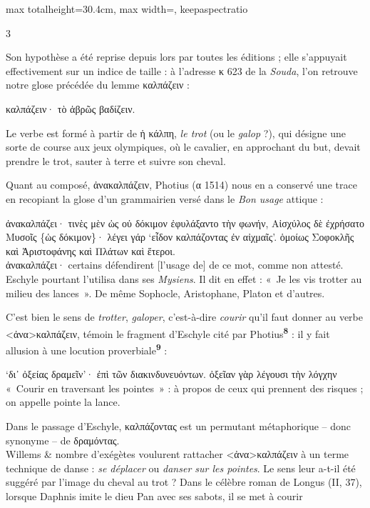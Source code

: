 \documentclass[11pt,twoside]{book}
\newcommand{\italique}[1]{\textit{#1}}
\newcommand{\citComm}[1]{\begin{quoting}[vskip=0.4pt,leftmargin=0.7em,rightmargin=0.2em]#1\end{quoting}}
\newcommand{\marqueur}[1]{\textsuperscript{\color{rubricRed}\textbf{#1}}}
\begin{document}
\begin{adjustbox}{max totalheight=30.4cm, max width=\textwidth, keepaspectratio}
\begin{minipage}{\textwidth}
{\begin{multicols}{3}
\par\vspace{1.5pt}
\noindent Son hypothèse a été reprise depuis lors par toutes les éditions ; elle s'appuyait effectivement sur un indice de taille : à l'adresse κ 623 de la \italique{Souda}, l'on retrouve notre glose précédée du lemme καλπάζειν :
\citComm{καλπάζειν· τὸ ἁβρῶς βαδίζειν.}
\par\vspace{1.5pt}
\noindent Le verbe est formé à partir de ἡ κάλπη, \italique{le trot} (ou le \italique{galop} ?), qui désigne une sorte de course aux jeux olympiques, où le cavalier, en approchant du but, devait prendre le trot, sauter à terre et suivre son cheval.
\par\vspace{1.5pt}
\noindent Quant au composé, ἀνακαλπάζειν, Photius (α 1514) nous en a conservé une trace en recopiant la glose d'un grammairien versé dans le \italique{Bon usage} attique :
\citComm{ἀνακαλπάζει· τινὲς μὲν ὡς οὐ δόκιμον ἐφυλάξαντο τὴν φωνήν, Αἰσχύλος δὲ ἐχρήσατο Μυσοῖς \{ὡς δόκιμον\}· λέγει γάρ `εἶδον καλπάζοντας ἐν αἰχμαῖς'. ὁμοίως Σοφοκλῆς καὶ Ἀριστοφάνης καὶ Πλάτων καὶ ἕτεροι.\\
ἀνακαλπάζει· certains défendirent [l'usage de] de ce mot, comme non attesté. Eschyle pourtant l'utilisa dans ses \italique{Mysiens}. Il dit en effet : «~Je les vis trotter au milieu des lances~». De même Sophocle, Aristophane, Platon et d'autres.}
\par\vspace{1.5pt}
\noindent C'est bien le sens de \italique{trotter}, \italique{galoper}, c'est-à-dire \italique{courir} qu'il faut donner au verbe <ἀνα>καλπάζειν, témoin le fragment d'Eschyle cité par Photius\marqueur{8} : il y fait allusion à une locution proverbiale\marqueur{9} :
\citComm{`δι᾽ ὀξείας δραμεῖν'· ἐπὶ τῶν διακινδυνευόντων. ὀξεῖαν γὰρ λέγουσι τὴν λόγχην\\
«~Courir en traversant les pointes~» : à propos de ceux qui prennent des risques ; on appelle pointe la lance.}
\par\vspace{1.5pt}
\noindent Dans le passage d'Eschyle, καλπάζοντας est un permutant métaphorique -- donc synonyme -- de δραμόντας.\\ Willems \& nombre d'exégètes voulurent rattacher <ἀνα>καλπάζειν à un terme technique de danse : \italique{se déplacer} ou \italique{danser sur les pointes}. Le sens leur a-t-il été suggéré par l'image du cheval au trot ? Dans le célèbre roman de Longus (II, 37), lorsque Daphnis imite le dieu Pan avec ses sabots, il se met à courir

\end{multicols}}
\end{minipage}
\end{adjustbox}
\end{document}
